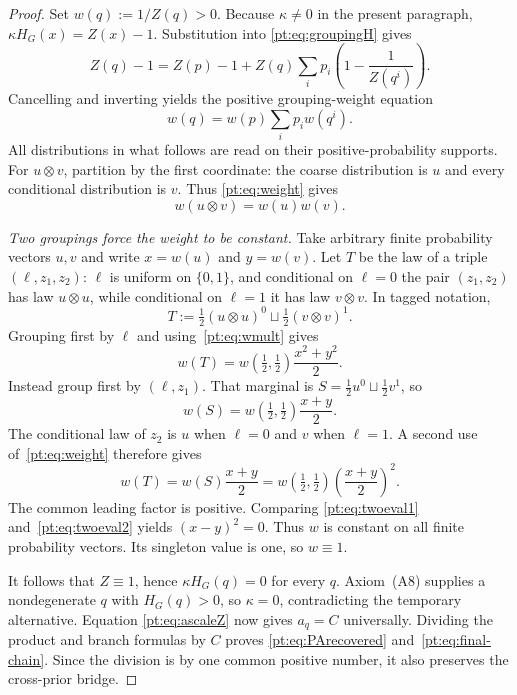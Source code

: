\begin{proof}
Set $w(q):=1/Z(q)>0$.  Because $\kappa\ne0$ in the present paragraph,
$\kappa H_G(x)=Z(x)-1$.  Substitution into
\eqref{pt:eq:groupingH} gives
\[
 Z(q)-1=Z(p)-1+
 Z(q)\sum_i p_i\left(1-\frac1{Z(q^i)}\right).
\]
Cancelling and inverting yields the positive grouping-weight equation
\begin{equation}
 w(q)=w(p)\sum_i p_iw(q^i).
\tag{W}\label{pt:eq:weight}
\end{equation}
All distributions in what follows are read on their positive-probability
supports.  For $u\otimes v$, partition by the first coordinate: the coarse
distribution is $u$ and every conditional distribution is $v$.  Thus
\eqref{pt:eq:weight} gives
\begin{equation}
 w(u\otimes v)=w(u)w(v).
\tag{M}\label{pt:eq:wmult}
\end{equation}

\emph{Two groupings force the weight to be constant.}
Take arbitrary finite probability vectors $u,v$ and write
$x=w(u)$ and $y=w(v)$.  Let $T$ be the law of a triple
$(\ell,z_1,z_2)$: $\ell$ is uniform on $\{0,1\}$, and conditional on
$\ell=0$ the pair $(z_1,z_2)$ has law $u\otimes u$, while conditional on
$\ell=1$ it has law $v\otimes v$.  In tagged notation,
\[
 T:=\tfrac12(u\otimes u)^0\sqcup\tfrac12(v\otimes v)^1.
\]
Grouping first by $\ell$ and using~\eqref{pt:eq:wmult} gives
\begin{equation}
 w(T)=w(\tfrac12,\tfrac12)\frac{x^2+y^2}{2}.
\tag{E1}\label{pt:eq:twoeval1}
\end{equation}
Instead group first by $(\ell,z_1)$.  That marginal is
$S=\tfrac12u^0\sqcup\tfrac12v^1$, so
\[
 w(S)=w(\tfrac12,\tfrac12)\frac{x+y}{2}.
\]
The conditional law of $z_2$ is $u$ when $\ell=0$ and $v$ when $\ell=1$.
A second use of~\eqref{pt:eq:weight} therefore gives
\begin{equation}
 w(T)=w(S)\frac{x+y}{2}
 =w(\tfrac12,\tfrac12)\left(\frac{x+y}{2}\right)^2.
\tag{E2}\label{pt:eq:twoeval2}
\end{equation}
The common leading factor is positive.  Comparing
\eqref{pt:eq:twoeval1} and~\eqref{pt:eq:twoeval2} yields $(x-y)^2=0$.
Thus $w$ is constant on all finite probability vectors.  Its singleton value
is one, so $w\equiv1$.

It follows that $Z\equiv1$, hence $\kappa H_G(q)=0$ for every $q$.
Axiom~\textup{(A8)} supplies a nondegenerate $q$ with $H_G(q)>0$, so
$\kappa=0$, contradicting the temporary alternative.  Equation
\eqref{pt:eq:ascaleZ} now gives $a_q=C$ universally.
Dividing the product and branch formulas by $C$ proves
\eqref{pt:eq:PArecovered} and~\eqref{pt:eq:final-chain}.  Since the division
is by one common positive number, it also preserves the cross-prior bridge.
\end{proof}


